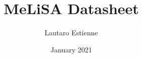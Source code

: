 \documentclass{article}
\title{MeLiSA Datasheet}
\author{Lautaro Estienne}
\date{January 2021}
\begin{document}
\maketitle

\newpage

\newcommand{\dssectionheader}[1]{%
   \noindent\framebox[\columnwidth]{%
      {\fontfamily{phv}\selectfont \textbf{\textcolor{blue}{#1}}}
   }
}

\newcommand{\dsquestion}[1]{%
   {\noindent \scriptsize {\fontfamily{phv}\selectfont \textcolor{blue}{\textbf{#1}}}}
}

\newcommand{\dsquestionex}[2]{%
   {\noindent \scriptsize {\fontfamily{phv}\selectfont \textcolor{blue}{\textbf{#1} #2}}}
}

\newcommand{\dsanswer}[1]{%
   {\noindent \footnotesize {#1} \medskip}
}

\end{document}
